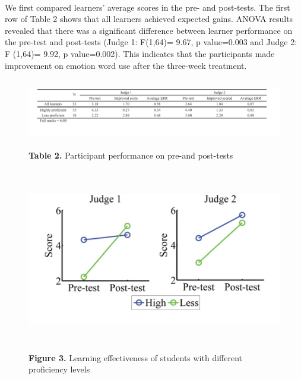 \documentclass[a4paper,12pt,oneside]{article}
\let\counterwithin\relax
\begin{document}
\paragraph{}
We first compared learners’ average scores in the pre- and post-tests. The first row of Table 2 shows that all learners achieved expected gains. ANOVA results revealed that there was a significant difference between learner performance on the pre-test and post-tests (Judge 1: F(1,64)= 9.67, p value=0.003 and Judge 2: F (1,64)= 9.92, p value=0.002). This indicates that the participants made improvement on emotion word use after the three-week treatment. 

\begin{figure}[H]
\includegraphics[height=3cm,width=15cm]{Table2.png}
\centering
\caption{\textbf{Table 2.} Participant performance on pre-and post-tests}
\end{figure}

\begin{figure}[H]
\includegraphics[height=8cm,width=16cm]{Figure3.png}
\centering
\caption{\textbf{Figure 3.} Learning effectiveness of students with different proficiency levels}
\end{figure}
\end{document}
